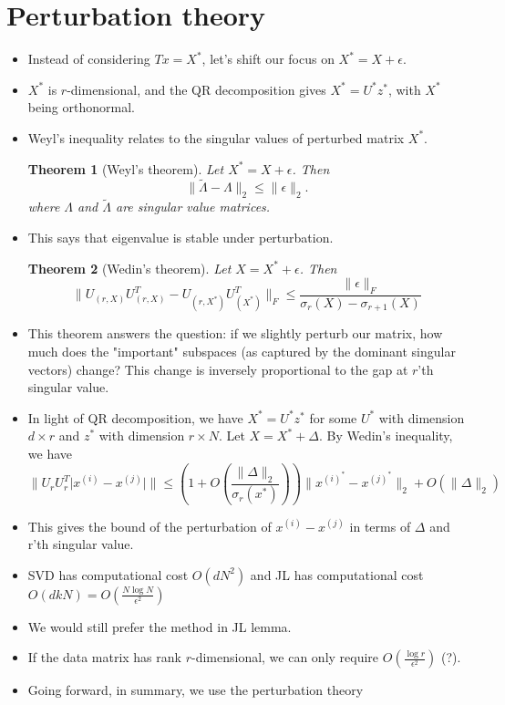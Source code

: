 \documentclass[11pt,reqno]{amsart}
\newtheorem{theorem}{Theorem}
\theoremstyle{remark}
\begin{document}
\section*{Perturbation theory}
\begin{itemize}
\item Instead of considering $Tx=X^*$, let's shift our focus on $X^* = X+\epsilon$.
\item $X^*$ is $r$-dimensional, and the QR decomposition gives $X^*=U^*z^*$, with 
$X^*$ being orthonormal.
\item Weyl's inequality relates to the singular values of perturbed matrix $X^*$.
\begin{theorem}[Weyl's theorem]\label{Theorem:Weyl}
Let $X^*=X+\epsilon$. Then
\[
\lVert \tilde\Lambda-\Lambda\rVert_2\leq\lVert\epsilon\rVert_2.
\]
where $\Lambda$ and $\tilde\Lambda$ are singular value matrices.
\end{theorem}
\item This says that eigenvalue is stable under perturbation. 
\begin{theorem}[Wedin's theorem]
Let $X=X^*+\epsilon$. Then 
\[
\lVert U_{(r,X)} U_{(r,X)}^T-U_{(r,X^*)} U_{(X^*)}^T\rVert_{F}\leq
\frac{\lVert\epsilon\rVert_{F}}{\sigma_r(X)-\sigma_{r+1}(X)}
\]
\end{theorem}
\item This theorem answers the question: if we slightly perturb our matrix, 
how much does the "important" subspaces (as captured by the dominant singular vectors)
 change? This change is inversely proportional to the gap at $r$'th singular value.
\item In light of QR decomposition, we have $X^* = U^* z^*$ for some 
$U^*$ with dimension $d\times r$ and $z^*$ with dimension $r\times N$. Let $X=X^*+\Delta$. By Wedin's inequality, we have
\[
\lVert U_r U_r^T \lvert x^{(i)}-x^{(j)}\rvert\rVert\leq (1+O(\frac{\lVert 
  \Delta\rVert_2}{\sigma_r(x^*)}))\lVert x^{(i)^*}
  -x^{(j)^*}\rVert_2+O(\lVert\Delta\rVert_2)
\]
\item This gives the bound of the perturbation of $x^{(i)}-x^{(j)}$ in terms 
of $\Delta$ and r'th singular value. 
\item SVD has computational cost $O(dN^2)$ and JL has computational cost 
$O(dkN)=O(\frac{N\log N}{\epsilon^2})$
\item We would still prefer the method in JL lemma.
\item If the data matrix has rank $r$-dimensional, we can only require $O(\frac{\log r}{\epsilon^2})$ (?).
 \item Going forward, in summary, we use the perturbation theory 

\end{itemize}
\end{document}
